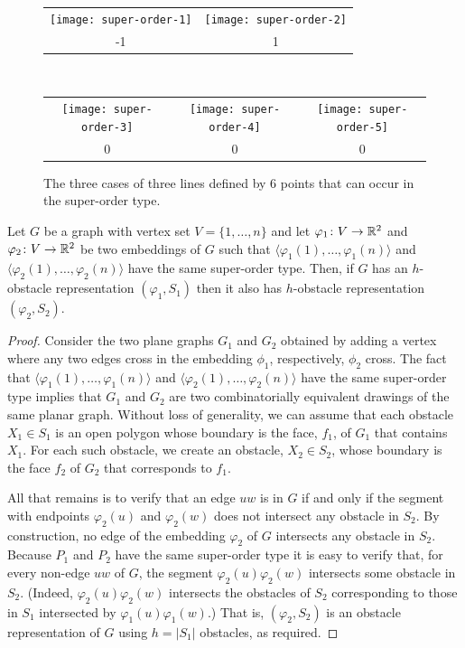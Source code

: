 \documentclass{patmorin}
\begin{document}
\begin{figure}[htbp]
  \begin{center}
    \begin{tabular}{cc}
       \texttt{[image: super-order-1]} &
       \texttt{[image: super-order-2]} \\ 
       -1 & 1 \\
    \end{tabular}\\[4ex]
    \begin{tabular}{ccc}
       \texttt{[image: super-order-3]} &
       \texttt{[image: super-order-4]} &
       \texttt{[image: super-order-5]} \\
       0 & 0 & 0
    \end{tabular}
  \end{center}
  \caption{The three cases of three lines defined by 6 points that can
      occur in the super-order type.}
\end{figure}

\begin{lem}
  Let $G$ be a graph with vertex set $V=\{1,\ldots,n\}$ and let
  $\varphi_1\colon V\to\mathbb{R}^2$ and $\varphi_2\colon V\to\mathbb{R}^2$ be two embeddings
  of $G$ such that $\langle\varphi_1(1),\ldots,\varphi_1(n)\rangle$
  and $\langle\varphi_2(1),\ldots,\varphi_2(n)\rangle$ have the same
  super-order type.  Then, if $G$ has an $h$-obstacle representation
  $(\varphi_1,S_1)$ then it also has $h$-obstacle representation
  $(\varphi_2,S_2)$.
\end{lem}

\begin{proof}
  Consider the two plane graphs $G_1$ and $G_2$ obtained by
  adding a vertex where any two edges cross in the embedding
  $\phi_1$, respectively, $\phi_2$ cross.  The fact that
  $\langle\varphi_1(1),\ldots,\varphi_1(n)\rangle$ and
  $\langle\varphi_2(1),\ldots,\varphi_2(n)\rangle$ have the same
  super-order type implies that $G_1$ and $G_2$ are two combinatorially
  equivalent drawings of the same planar graph.  Without loss of
  generality, we can assume that each obstacle $X_1\in S_1$ is an open
  polygon whose boundary is the face, $f_1$, of $G_1$ that contains $X_1$.
  For each such obstacle, we create an obstacle, $X_2\in S_2$, whose boundary
  is the face $f_2$ of $G_2$ that corresponds to $f_1$.  

  All that remains is to verify that an edge $uw$ is in $G$ if and only
  if the segment with endpoints $\varphi_2(u)$ and $\varphi_2(w)$ does not
  intersect any obstacle in $S_2$.
  By construction, no edge of the embedding $\varphi_2$ of $G$
  intersects any obstacle in $S_2$.  Because $P_1$ and $P_2$ have the
  same super-order type it is easy to verify that, for every non-edge
  $uw$ of $G$, the segment $\varphi_2(u)\varphi_2(w)$ intersects some
  obstacle in $S_2$. (Indeed, $\varphi_2(u)\varphi_2(w)$ intersects
  the obstacles of $S_2$ corresponding to those in $S_1$ intersected
  by $\varphi_1(u)\varphi_1(w)$.)  That is, $(\varphi_2,S_2)$ is an
  obstacle representation of $G$ using $h=|S_1|$ obstacles, as required.
\end{proof}
\end{document}
